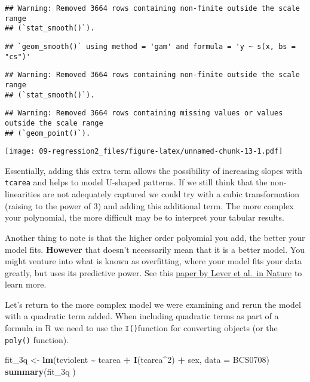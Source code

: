 \documentclass[
]{book}
\newenvironment{Shaded}{\begin{snugshade}}{\end{snugshade}}
\newcommand{\AttributeTok}[1]{\textcolor[rgb]{0.13,0.29,0.53}{#1}}
\newcommand{\DecValTok}[1]{\textcolor[rgb]{0.00,0.00,0.81}{#1}}
\newcommand{\FunctionTok}[1]{\textcolor[rgb]{0.13,0.29,0.53}{\textbf{#1}}}
\newcommand{\NormalTok}[1]{#1}
\newcommand{\OtherTok}[1]{\textcolor[rgb]{0.56,0.35,0.01}{#1}}
\newcommand{\SpecialCharTok}[1]{\textcolor[rgb]{0.81,0.36,0.00}{\textbf{#1}}}
\begin{document}
\begin{verbatim}
## Warning: Removed 3664 rows containing non-finite outside the scale range
## (`stat_smooth()`).
\end{verbatim}

\begin{verbatim}
## `geom_smooth()` using method = 'gam' and formula = 'y ~ s(x, bs = "cs")'
\end{verbatim}

\begin{verbatim}
## Warning: Removed 3664 rows containing non-finite outside the scale range
## (`stat_smooth()`).
\end{verbatim}

\begin{verbatim}
## Warning: Removed 3664 rows containing missing values or values outside the scale range
## (`geom_point()`).
\end{verbatim}

\texttt{[image: 09-regression2\_files/figure-latex/unnamed-chunk-13-1.pdf]}

Essentially, adding this extra term allows the possibility of increasing slopes with \texttt{tcarea} and helps to model U-shaped patterns. If we still think that the non-linearities are not adequately captured we could try with a cubic transformation (raising to the power of 3) and adding this additional term. The more complex your polynomial, the more difficult may be to interpret your tabular results.

Another thing to note is that the higher order polyomial you add, the better your model fits. \textbf{However} that doesn't necessarily mean that it is a better model. You might venture into what is known as overfitting, where your model fits your data greatly, but uses its predictive power. See this \href{http://www.nature.com/nmeth/journal/v13/n9/full/nmeth.3968.html}{paper by Lever et al.~in Nature} to learn more.

Let's return to the more complex model we were examining and rerun the model with a quadratic term added. When including quadratic terms as part of a formula in R we need to use the \texttt{I()}function for converting objects (or the \texttt{poly()} function).

\begin{Shaded}
\begin{Highlighting}[]
\NormalTok{fit\_3q }\OtherTok{\textless{}{-}} \FunctionTok{lm}\NormalTok{(tcviolent }\SpecialCharTok{\textasciitilde{}}\NormalTok{ tcarea }\SpecialCharTok{+} \FunctionTok{I}\NormalTok{(tcarea}\SpecialCharTok{\^{}}\DecValTok{2}\NormalTok{) }\SpecialCharTok{+}\NormalTok{ sex, }\AttributeTok{data =}\NormalTok{ BCS0708)}
\FunctionTok{summary}\NormalTok{(fit\_3q )}
\end{Highlighting}
\end{Shaded}
\end{document}
